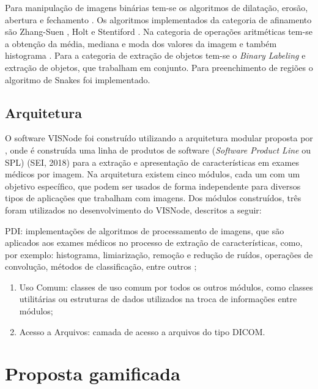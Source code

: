 \documentclass[
	12pt,				%
	oneside,			%
	a4paper,			%
	english,			%
	french,				%
	spanish,			%
	brazil,				%
	]{abntex2}
\begin{document}
Para manipulação de imagens binárias tem-se os algoritmos de dilatação, erosão, abertura e fechamento \cite{gonzalesWoods:2008}. Os algoritmos implementados da categoria de afinamento são Zhang-Suen \cite{zhang1984fast}, Holt \cite{holt1987improved} e Stentiford \cite{stentiford1983some}. Na categoria de operações aritméticas tem-se a obtenção da média, mediana e moda dos valores da imagem e também histograma \cite{gonzalesWoods:2008}. Para a categoria de extração de objetos tem-se o \textit{Binary Labeling} \cite{gonzalesWoods:2008} e extração de objetos, que trabalham em conjunto. Para preenchimento de regiões o algoritmo de Snakes \cite{kass:1988} foi implementado.


\subsection{Arquitetura}

O software VISNode foi construído utilizando a arquitetura modular proposta por \citet{reisferramenta}, onde é construída uma linha de produtos de software (\textit{Software Product Line} ou SPL) (SEI, 2018)  para a extração e apresentação de características em exames médicos por imagem. Na arquitetura existem cinco módulos, cada um com um objetivo específico, que podem ser usados de forma independente para diversos tipos de aplicações que trabalham com imagens. Dos módulos construídos, três foram utilizados no desenvolvimento do VISNode, descritos a seguir:

PDI: implementações de algoritmos de processamento de imagens, que são aplicados aos exames médicos no processo de extração de características, como, por exemplo: histograma, limiarização, remoção e redução de ruídos, operações de convolução, métodos de classificação, entre outros \cite{reisferramenta}; 

\begin{enumerate}
\item Uso Comum: classes de uso  comum  por todos os outros módulos, como classes utilitárias ou estruturas de dados utilizados na troca de informações entre módulos; 
\item Acesso a Arquivos: camada de acesso a arquivos do tipo DICOM.
\end{enumerate}

\section{Proposta gamificada}
\end{document}
